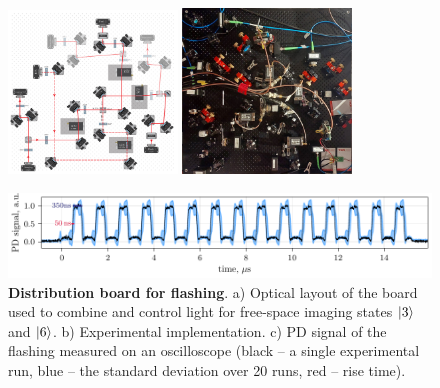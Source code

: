 \begin{figure}[h!]
    \centering
     \phantom{4}
    \includegraphics[width=0.4\textwidth]{fig-ai/flashing-distribution-scheme.pdf}
    \hspace{10 mm} 
     \phantom{4}
    \includegraphics[width=0.4\textwidth]{imgs/flashing-distribution-img.jpg}

    \includegraphics{fig-py/flashing-oscilloscope.pdf}

    \caption{
        \textbf{Distribution board for flashing}. 
        a) Optical layout of the board used to combine and control light for free-space imaging states $\left| 3 \right\rangle$ and $\left| 6 \right\rangle$.
        b) Experimental implementation.
        c) PD signal of the flashing measured on an oscilloscope (black -- a single experimental run, blue -- the standard deviation over 20 runs, red -- rise time).
    }
    \label{fig:flashing}
\end{figure}

\newpage

